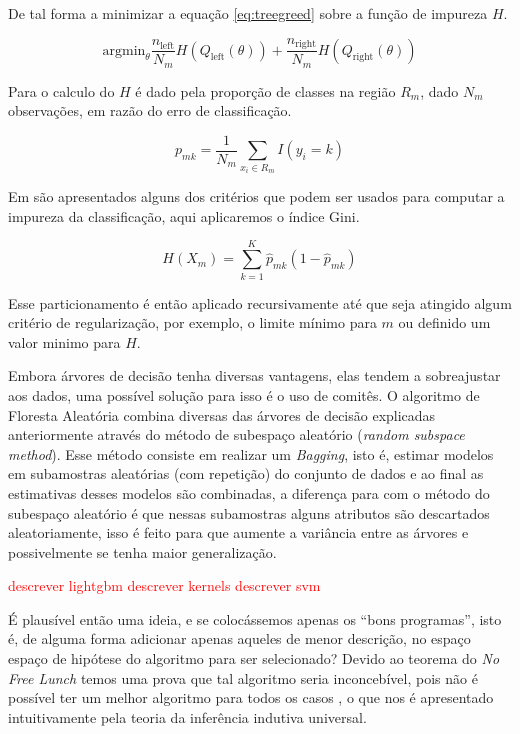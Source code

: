 De tal forma a minimizar a equação \ref{eq:treegreed} sobre a função de
impureza $H$.

\begin{equation}
    \text{argmin}_{\theta} \frac{n_{\text{left}}}{N_m} H(Q_{\text{left}}(\theta)) +
    \frac{n_{\text{right}}}{N_m} H(Q_{\text{right}}(\theta))
    \label{eq:treegreed}
\end{equation}

Para o calculo do $H$ é dado pela proporção de classes na região $R_m$,
dado $N_m$ observações, em razão do erro de classificação.

\begin{equation}
    p_{mk} = \frac{1}{N_m} \sum_{x_i \in R_m} I(y_i = k)
\end{equation}

Em \cite{friedman2001elements} são apresentados alguns dos critérios que podem
ser usados para computar a impureza da classificação, aqui aplicaremos o índice
Gini.

\begin{equation}
    H(X_m) = \sum_{k=1}^{K} \hat{p}_{mk}(1 - \hat{p}_{mk})
    \label{eq:gini}
\end{equation}

Esse particionamento é então aplicado recursivamente até que seja atingido
algum critério de regularização, por exemplo, o limite mínimo para $m$ ou
definido um valor minimo para $H$.

Embora árvores de decisão tenha diversas vantagens, elas tendem a sobreajustar
aos dados, uma possível solução para isso é o uso de comitês. O algoritmo de
Floresta Aleatória combina diversas das árvores de decisão explicadas
anteriormente através do método de subespaço aleatório (\textit{random subspace
method}). Esse método consiste em realizar um \textit{Bagging}, isto é, estimar
modelos em subamostras aleatórias (com repetição) do conjunto de dados e ao
final as estimativas desses modelos são combinadas, a diferença para com o
método do subespaço aleatório é que nessas subamostras alguns atributos são
descartados aleatoriamente, isso é feito para que aumente a variância entre as
árvores e possivelmente se tenha maior generalização.



\textcolor{red}{
descrever lightgbm
descrever kernels
descrever svm
}

É plausível então uma ideia, e se colocássemos apenas os ``bons programas'',
isto é, de alguma forma adicionar apenas aqueles de menor descrição, no espaço
espaço de hipótese do algoritmo para ser selecionado? Devido ao teorema do
\textit{No Free Lunch} \cite{wolpert1997no,wolpert1996lack} temos uma prova que
tal algoritmo seria inconcebível, pois não é possível ter um melhor algoritmo
para todos os casos \cite{rathmanner2011philosophical}, o que nos é apresentado
intuitivamente pela teoria da inferência indutiva universal.

